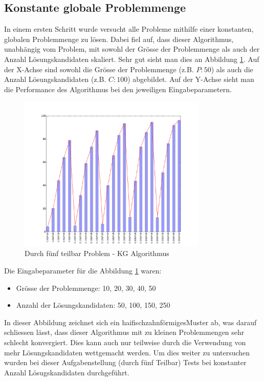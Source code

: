 \subsection{Konstante globale Problemmenge}
In einem ersten Schritt wurde versucht alle Probleme mithilfe einer konstanten, globalen Problemmenge zu lösen. Dabei fiel auf, dass dieser Algorithmus, unabhängig vom Problem, mit sowohl der Grösse der Problemmenge als auch der Anzahl Lösungskandidaten skaliert. Sehr gut sieht man dies an Abbildung \ref{fig:c_g_div5}. Auf der X-Achse sind sowohl die Grösse der Problemmenge (z.B. $P:50$) als auch die Anzahl Lösungskandidaten (z.B. $C:100$) abgebildet. Auf der Y-Achse sieht man die Performance des Algorithmus bei den jeweiligen Eingabeparametern.

\begin{figure}[h]
  \centering
  \includegraphics[width=0.8\textwidth]{images/C_G_div5_solved.pdf}
  \caption[Durch fünf teilbar Problem - KG Algorithmus]{Durch fünf teilbar Problem - KG Algorithmus}
  \label{fig:c_g_div5}
\end{figure}

Die Eingabeparameter für die Abbildung \ref{fig:c_g_div5} waren:
\begin{itemize}
	\item Grösse der Problemmenge: 10, 20, 30, 40, 50
	\item Anzahl der Lösungskandidaten: 50, 100, 150, 250
\end{itemize}

In dieser Abbildung zeichnet sich ein \flqq haifischzahnförmiges\frqq Muster ab, was darauf schliessen lässt, dass dieser Algorithmus mit zu kleinen Problemmengen sehr schlecht konvergiert. Dies kann auch nur teilweise durch die Verwendung von mehr Lösungskandidaten wettgemacht werden. Um dies weiter zu untersuchen wurden bei dieser Aufgabenstellung (durch fünf Teilbar) Tests bei konstanter Anzahl Lösugskandidaten durchgeführt. 

